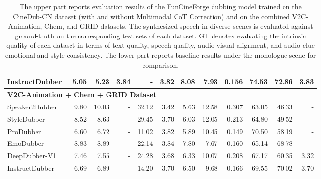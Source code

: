 \documentclass{article}
\begin{document}
\begin{table}
{\begin{tabular}{l|rrrrrrrrrrr}
        InstructDubber~\cite{InstructDubber}& 5.05          & 5.23                      & 3.84                  & -                     & 3.82              & 8.08              & 7.93              & 0.156                 & 74.53                 & 72.86                 & 3.83  \\
        \midrule
        \multicolumn{12}{l}{\textbf{V2C-Animation + Chem + GRID Dataset}} \\
        \midrule
        Speaker2Dubber~\cite{Speaker2Dubber}& 9.80          & 10.03                     & -                     & 32.12                 & 3.42              & 5.63              & 12.58             & 0.307                 & 63.05                 & 46.33                 & -  \\
        StyleDubber~\cite{StyleDubber}      & 8.52          & 8.63                      & -                     & 29.45                 & 3.70              & 6.03              & 12.05             & 0.213                 & 64.80                 & 49.52                 & -  \\
        ProDubber~\cite{ProDubber}          & 6.60          & 6.72                      & -                     & 11.02                 & 3.82              & 5.89              & 10.45             & 0.149                 & 70.50                 & 58.19                 & -  \\
        EmoDubber~\cite{EmoDubber}          & 8.83          & 8.89                      & -                     & 22.14                 & 3.84              & 7.80              & 7.67              & 0.160                 & 65.14                 & 68.78                 & -  \\
        DeepDubber-V1~\cite{DeepDubber-V1}  & 7.46          & 7.55                      & -                     & 24.28                 & 3.68              & 6.33              & 10.07             & 0.208                 & 67.17                 & 60.35                 & 3.32  \\
        InstructDubber~\cite{InstructDubber}& 6.69          & 6.89                      & -                     & 14.20                 & 3.70              & 6.50              & 9.68              & 0.166                 & 69.55                 & 70.02                 & 3.70  \\
        \bottomrule
    \end{tabular}
    }
\caption{The upper part reports evaluation results of the FunCineForge dubbing model trained on the CineDub-CN dataset (with and without Multimodal CoT Correction) and on the combined V2C-Animation, Chem, and GRID datasets.
The synthesized speech in diverse scenes is evaluated against ground-truth on the corresponding test sets of each dataset.
GT denotes evaluating the intrinsic quality of each dataset in terms of text quality, speech quality, audio-visual alignment, and audio-clue emotional and style consistency.
The lower part reports baseline results under the monologue scene for comparison.
}
\label{tab:correction}
\end{table}
\end{document}
